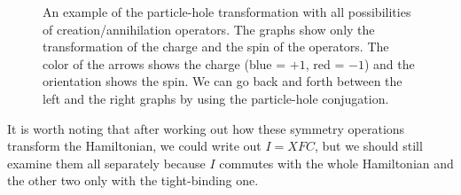 \begin{figure}
\begin{center}
  \end{center}
  \caption{An example of the particle-hole transformation with all possibilities of creation/annihilation operators. The graphs show only the transformation of the charge and the spin of the operators. The color of the arrows shows the charge (blue = $+1$, red = $-1$) and the orientation shows the spin. We can go back and forth between the left and the right graphs by using the particle-hole conjugation.}
  \label{fig:ph-flip}
\end{figure}

It is worth noting that after working out how these symmetry operations transform the Hamiltonian, we could write out $I = XFC$, but we should still examine them all separately because $I$ commutes with the whole Hamiltonian and the other two only with the tight-binding one.


    

